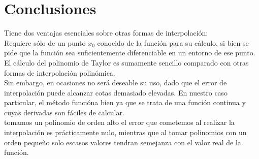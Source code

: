 \documentclass[spanish,a4paper,11pt,twoside]{report}
\begin{document}
\chapter{Conclusiones}
\label{chapter:conclusiones}

	Tiene dos ventajas esenciales sobre otras formas de interpolación: \\
Requiere sólo de un punto $x_0$ conocido de la función para su cálculo, 
si bien se pide que la función sea suficientemente diferenciable en un 
entorno de ese punto.\\
El cálculo del polinomio de Taylor es sumamente sencillo comparado con 
otras formas de interpolación polinómica.\\
Sin embargo, en ocasiones no será deseable su uso, dado que el error de 
interpolación puede alcanzar cotas demasiado elevadas. En nuestro caso 
particular, el método funcióna bien ya que se trata de una función 
continua y cuyas derivadas son fáciles de calcular.\\
tomamos un polinomio de orden alto el error que cometemos al realizar la 
interpolación es prácticamente nulo, mientras que al tomar polinomios 
con un orden pequeño solo escasos valores tendran semejanza con el valor 
real de la función.\\
%

\end{document}
